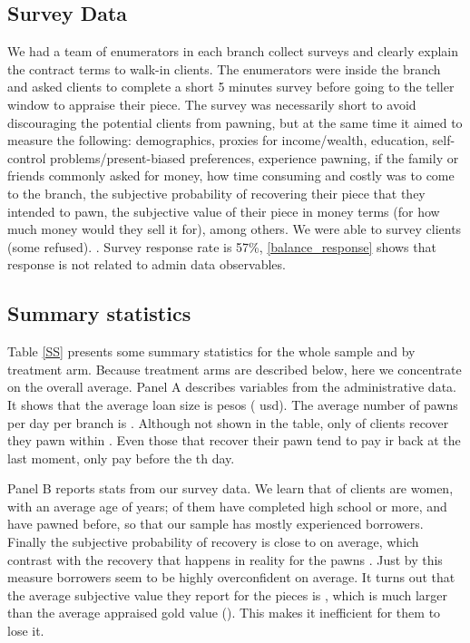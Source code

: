 \documentclass[11pt]{article}
\begin{document}
\subsection{Survey Data} 

We had a team of enumerators in each branch collect surveys and clearly explain the contract terms to walk-in clients. The enumerators were inside the branch and asked clients to complete a short 5 minutes survey before going to the teller window to appraise their piece. The survey was necessarily short to avoid discouraging the potential clients from pawning, but at the same time it aimed to measure the following: demographics, proxies for income/wealth, education, self-control problems/present-biased preferences, experience pawning, if the family or friends commonly asked for money, how time consuming and costly was to come to the branch, the subjective probability of recovering their piece that they intended to pawn, the subjective value of their piece in money terms (for how much money would they sell it for), among others. We were able to survey  clients (some refused). %
. Survey response rate is 57\%,  \ref{balance_response} shows that response is not related to admin data observables.


\subsection{Summary statistics}

Table \ref{SS} presents some summary statistics for the whole sample and by treatment arm. Because treatment arms are described below, here we concentrate on the overall average. Panel A describes variables from the administrative data. It shows that the average loan size is  pesos ( usd). The average number of pawns per day per branch is . Although not shown in the table, only  of clients recover they pawn within . Even those that recover their pawn tend to pay ir back at the last moment, only  pay before the th day.

Panel B reports stats from our survey data. We learn that  of clients are women, with an average age of  years;  of them have completed high school or more, and  have pawned before, so that our sample has mostly experienced borrowers. Finally the subjective probability of recovery is close to  on average, which contrast with the  recovery that happens in reality for the pawns . Just by this measure borrowers seem to be highly overconfident on average. It turns out that the average subjective value they report for the pieces is  , which is much larger than the average appraised gold value (). This makes it inefficient for them to lose it.
\end{document}
